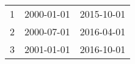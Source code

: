 % 
\begin{tabular}{ccc}
  \hline
  \hline
1 & 2000-01-01 & 2015-10-01 \\ 
  2 & 2000-07-01 & 2016-04-01 \\ 
  3 & 2001-01-01 & 2016-10-01 \\ 
   \hline
\end{tabular}
